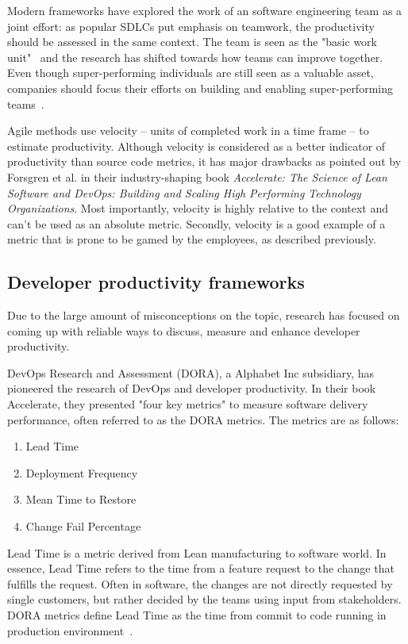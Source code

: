 Modern frameworks have explored the work of an software engineering team as a joint effort: as popular SDLCs put emphasis on teamwork, the productivity should be assessed in the same context. The team is seen as the "basic work unit"~\cite{moe_overcoming_2010} and the research has shifted towards how teams can improve together. Even though super-performing individuals are still seen as a valuable asset, companies should focus their efforts on building and enabling super-performing teams~\cite{forsgren_space_2021}. 

Agile methods use velocity – units of completed work in a time frame – to estimate productivity. Although velocity is considered as a better indicator of productivity than source code metrics, it has major drawbacks as pointed out by Forsgren et al. in their industry-shaping book \textit{Accelerate: The Science of Lean Software and DevOps: Building and Scaling High Performing Technology Organizations}. Most importantly, velocity is highly relative to the context and can't be used as an absolute metric. Secondly, velocity is a good example of a metric that is prone to be gamed by the employees, as described previously.~\cite{forsgren_accelerate_2018}
 
\subsection{Developer productivity frameworks}

Due to the large amount of misconceptions on the topic, research has focused on coming up with reliable ways to discuss, measure and enhance developer productivity.

DevOps Research and Assessment (DORA), a Alphabet Inc subsidiary, has pioneered the research of DevOps and developer productivity. In their book Accelerate, they presented "four key metrics" to measure software delivery performance, often referred to as the DORA metrics. The metrics are as follows: 

\begin{enumerate}
\item Lead Time
\item Deployment Frequency
\item Mean Time to Restore
\item Change Fail Percentage
\end{enumerate}

Lead Time is a metric derived from Lean manufacturing to software world. In essence, Lead Time refers to the time from a feature request to the change that fulfills the request. Often in software, the changes are not directly requested by single customers, but rather decided by the teams using input from stakeholders. DORA metrics define Lead Time as the time from commit to code running in production environment~\cite{forsgren_accelerate_2018}.


